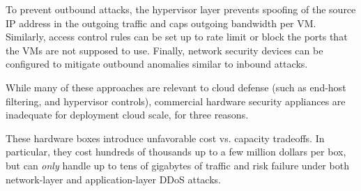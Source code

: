 
To prevent outbound attacks,
the hypervisor layer prevents spoofing of the source IP address in the outgoing traffic
and caps outgoing bandwidth per VM.
Similarly, access control rules can be set up to rate limit or 
block the ports that the VMs are not supposed to use. Finally,  
network security devices can be configured to mitigate outbound anomalies similar
to inbound attacks. 

%
While many of these approaches are relevant to cloud defense (such as
end-host filtering, and hypervisor controls), commercial hardware
security appliances are inadequate for deployment cloud scale, for
three reasons.


 These hardware boxes introduce unfavorable cost
vs. capacity tradeoffs. In particular, they cost hundreds of thousands
up to a few million dollars per box, but can {\em only} handle up to
tens of gigabytes of traffic and risk failure under both network-layer
and application-layer DDoS attacks.
~\cite{ADC}

